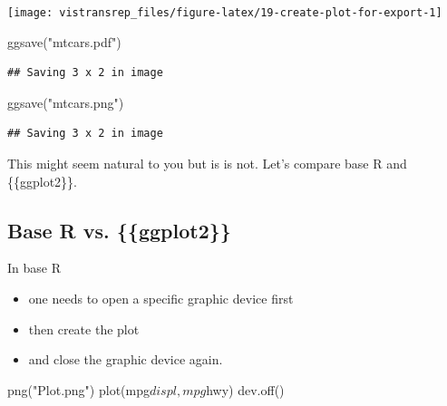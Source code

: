 \documentclass[]{book}
\newenvironment{Shaded}{}{}
\newcommand{\KeywordTok}[1]{\textcolor[rgb]{0.00,0.00,1.00}{#1}}
\newcommand{\NormalTok}[1]{#1}
\newcommand{\OperatorTok}[1]{#1}
\newcommand{\StringTok}[1]{\textcolor[rgb]{0.00,0.50,0.50}{#1}}
\begin{document}
\begin{flushright}\texttt{[image: vistransrep\_files/figure-latex/19-create-plot-for-export-1]} \end{flushright}

\begin{Shaded}
\begin{Highlighting}[]
\KeywordTok{ggsave}\NormalTok{(}\StringTok{"mtcars.pdf"}\NormalTok{)}
\end{Highlighting}
\end{Shaded}

\begin{verbatim}
## Saving 3 x 2 in image
\end{verbatim}

\begin{Shaded}
\begin{Highlighting}[]
\KeywordTok{ggsave}\NormalTok{(}\StringTok{"mtcars.png"}\NormalTok{)}
\end{Highlighting}
\end{Shaded}

\begin{verbatim}
## Saving 3 x 2 in image
\end{verbatim}

This might seem natural to you but is is not.
Let's compare base R and \{\{ggplot2\}\}.

\hypertarget{base-r-vs.-ggplot2}{%
\subsection{Base R vs. \{\{ggplot2\}\}}\label{base-r-vs.-ggplot2}}

In base R

\begin{itemize}
\item
  one needs to open a specific graphic device first
\item
  then create the plot
\item
  and close the graphic device again.
\end{itemize}

\begin{Shaded}
\begin{Highlighting}[]
\KeywordTok{png}\NormalTok{(}\StringTok{"Plot.png"}\NormalTok{)}
\KeywordTok{plot}\NormalTok{(mpg}\OperatorTok{$}\NormalTok{displ, mpg}\OperatorTok{$}\NormalTok{hwy)}
\KeywordTok{dev.off}\NormalTok{()}
\end{Highlighting}
\end{Shaded}
\end{document}
